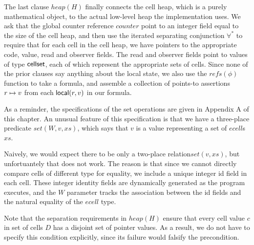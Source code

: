 The last clause $heap(H)$ finally connects the cell heap, which is a
purely mathematical object, to the actual low-level heap the
implementation uses. We ask that the global counter reference
$counter$ point to an integer field equal to the size of the cell
heap, and then use the iterated separating conjunction $\forall^*$ to
require that for each cell in the cell heap, we have pointers to the
appropriate code, value, read and observer fields. The read and
observer fields point to values of type $\mathsf{cellset}$, each of which
represent the appropriate sets of cells.  Since none of the prior
clauses say anything about the local state, we also use the
$\mathit{refs}(\phi)$ function to take a formula, and assemble a
collection of points-to assertions $r \mapsto v$ from each
$\mathsf{local}({r}, {v})$ in our formula. 

As a reminder, the specifications of the set operations are given in
Appendix A of this chapter. An unusual feature of this specification
is that we have a three-place predicate $\mathit{set}(W, v, xs)$,
which says that $v$ is a value representing a set of $\mathit{ecell}$s
$xs$.

Naively, we would expect there to be only a two-place
relation$\mathit{set}(v, xs)$, but unfortuantely that does not work.
The reason is that since we cannot directly compare cells of different
type for equality, we include a unique integer id field in each
cell. These integer identity fields are dynamically generated as the
program executes, and the $W$ parameter tracks the association between
the id fields and the natural equality of the $\mathit{ecell}$ type.

Note that the separation requirements in $\mathit{heap}(H)$ ensure
that every cell value $c$ in set of cells $D$ has a disjoint set of
pointer values. As a result, we do not have to specify this condition
explicitly, since its failure would falsify the precondition.

